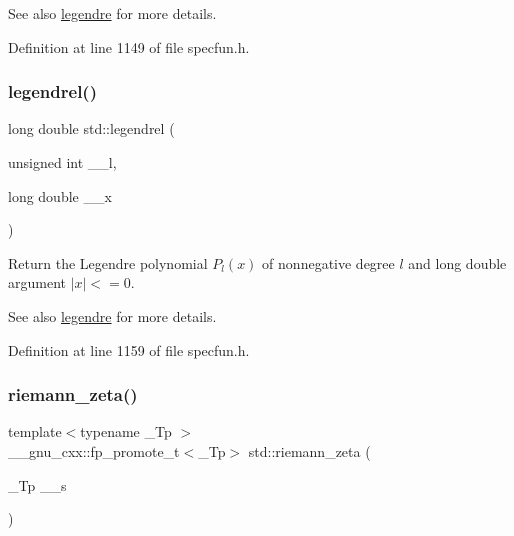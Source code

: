 \begin{DoxySeeAlso}{See also}
\hyperlink{group__tr29124__math__spec__func_gad06811f4e139b0ba84235c1f0d34d86e}{legendre} for more details. 
\end{DoxySeeAlso}


Definition at line 1149 of file specfun.\+h.

\mbox{\label{group__tr29124__math__spec__func_ga1b39bc22e3cc4860d08eb54099460391}} 
\subsubsection{\texorpdfstring{legendrel()}{legendrel()}}
{\footnotesize\ttfamily long double std\+::legendrel (\begin{DoxyParamCaption}\item[{unsigned int}]{\+\_\+\+\_\+l,  }\item[{long double}]{\+\_\+\+\_\+x }\end{DoxyParamCaption})\hspace{0.3cm}{\ttfamily [inline]}}

Return the Legendre polynomial $ P_l(x) $ of nonnegative degree $ l $ and {\ttfamily long double} argument $ |x| <= 0 $.

\begin{DoxySeeAlso}{See also}
\hyperlink{group__tr29124__math__spec__func_gad06811f4e139b0ba84235c1f0d34d86e}{legendre} for more details. 
\end{DoxySeeAlso}


Definition at line 1159 of file specfun.\+h.

\mbox{\label{group__tr29124__math__spec__func_gac4ef9d52ee583c77937c3a420b7c72ca}} 
\subsubsection{\texorpdfstring{riemann\+\_\+zeta()}{riemann\_zeta()}}
{\footnotesize\ttfamily template$<$typename \+\_\+\+Tp $>$ \\
\+\_\+\+\_\+gnu\+\_\+cxx\+::fp\+\_\+promote\+\_\+t$<$\+\_\+\+Tp$>$ std\+::riemann\+\_\+zeta (\begin{DoxyParamCaption}\item[{\+\_\+\+Tp}]{\+\_\+\+\_\+s }\end{DoxyParamCaption})\hspace{0.3cm}{\ttfamily [inline]}}

